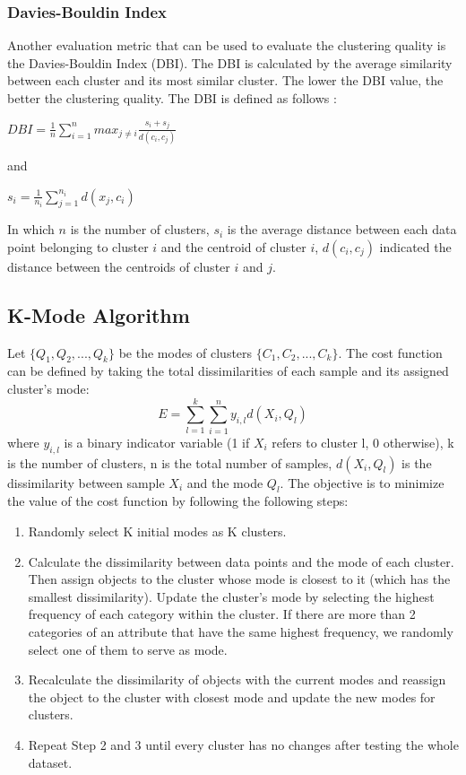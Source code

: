\documentclass{article}
\begin{document}
\subsubsection{Davies-Bouldin Index}

\noindent Another evaluation metric that can be used to evaluate
the clustering quality is the Davies-Bouldin Index (DBI). The DBI
is calculated by the average similarity between each cluster and its
most similar cluster. The lower the DBI value, the better the clustering
quality. The DBI is defined as follows \citep{HOSEN2023688}:
\begin{center}

$ DBI = \frac{1}{n} \sum_{i=1}^{n} max_{j \neq i} \frac{s_i + s_j}{d(c_i,c_j)}$

\end{center}
and
\begin{center}
$s_i = \frac{1}{n_i} \sum_{j=1}^{n_i} d(x_j,c_i)$
\end{center}
\noindent In which $n$ is the number of clusters, $s_i$ is the average distance between
each data point belonging to cluster $i$ and the centroid of cluster $i$, 
$d(c_i,c_j)$ indicated the distance between the centroids of cluster $i$ and
$j$.

\subsection{K-Mode Algorithm\citep{huang1998extensions}}
Let $\{Q_1,Q_2,...,Q_k\}$ be the modes of clusters $\{C_1,C_2,...,C_k\}$. The cost function can be defined by taking the total dissimilarities of each sample and its assigned cluster's mode: 
$$E = \sum_{l=1}^{k}\sum_{i=1}^{n}y_{i,l}d(X_i,Q_l)$$ 
where $y_{i,l}$ is a binary indicator variable (1 if $X_i$ refers to cluster l, 0 otherwise), k is the number of clusters, n is the total number of samples, $d(X_i,Q_l)$ is the dissimilarity between sample $X_i$ and the mode $Q_l$. The objective is to minimize the value of the cost function by following the following steps: 

\begin{enumerate}
    \item Randomly select K initial modes as K clusters.
    
    \item Calculate the dissimilarity between data points and the mode of each cluster. Then assign objects to the cluster whose mode is closest to it (which has the smallest dissimilarity). Update the cluster’s mode by selecting the highest frequency of each category within the cluster. If there are more than 2 categories of an attribute that have the same highest frequency, we randomly select one of them to serve as mode.
    
    \item Recalculate the dissimilarity of objects with the current modes and reassign the object to the cluster with closest mode and update the new modes for clusters.
    
    \item Repeat Step 2 and 3 until every cluster has no changes after testing the whole dataset.
\end{enumerate}
\end{document}
